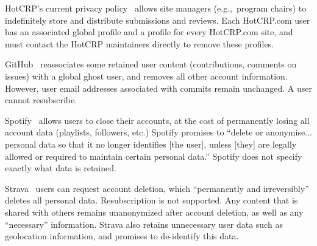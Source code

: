 HotCRP's current privacy policy~\cite{hotcrp:privacy} allows site managers (e.g.,\ program chairs)
to indefinitely store and distribute submissions and reviews. Each HotCRP.com user has an associated
global profile and a profile for every HotCRP.com site, and must contact the HotCRP maintainers
directly to remove these profiles.

GitHub~\cite{github:privacy} reassociates some retained user content (contributions, comments on
issues) with a global ghost user, and removes all other account information. However, user email
addresses associated with commits remain unchanged. A user cannot resubscribe.

Spotify~\cite{spotify:privacy} allows users to close their accounts, at the cost of permanently
losing all account data (playlists, followers, etc.) Spotify promises to ``delete or anonymise...
personal data so that it no longer identifies [the user], unless [they] are legally allowed or
required to maintain certain personal data.'' Spotify does not specify exactly what data is
retained.

Strava~\cite{strava:privacy} users can request account deletion, which ``permanently and
irreversibly'' deletes all personal data. Resubscription is not supported. Any content that is
shared with others remains unanonymized after account deletion, as well as any ``necessary''
information. Strava also retains unnecessary user data such as geolocation information, and promises
to de-identify this data.

